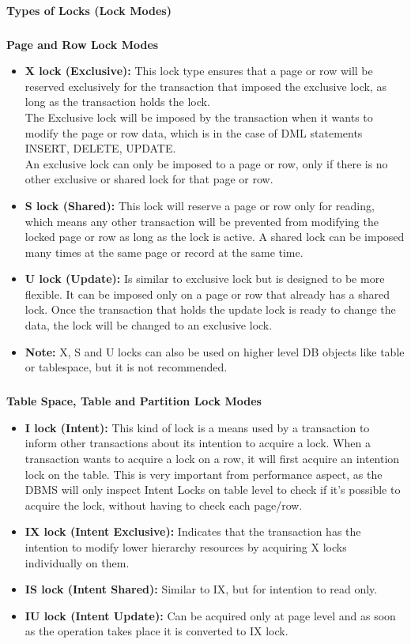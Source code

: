 \paragraph{} \textbf{Types of Locks (Lock Modes)}
\subparagraph{} \textbf{Page and Row Lock Modes}
\begin{itemize}
	\item \textbf{X lock (Exclusive):} This lock type ensures that a page or row will be reserved exclusively for the transaction that imposed the exclusive lock, as long as the transaction holds the lock.\\The Exclusive lock will be imposed by the transaction when it wants to modify the page or row data, which is in the case of DML statements INSERT, DELETE, UPDATE.\\An exclusive lock can only be imposed to a page or row, only if there is no other exclusive or shared lock for that page or row.
	\item \textbf{S lock (Shared):} This lock will reserve a page or row only for reading, which means any other transaction will be prevented from modifying the locked page or row as long as the lock is active. A shared lock can be imposed many times at the same page or record at the same time.
	\item \textbf{U lock (Update):} Is similar to exclusive lock but is designed to be more flexible. It can be imposed only on a page or row that already has a shared lock. Once the transaction that holds the update lock is ready to change the data, the lock will be changed to an exclusive lock.
	\item \textbf{Note:} X, S and U locks can also be used on higher level \acs{DB} objects like table or tablespace, but it is not recommended.
\end{itemize}
\subparagraph{} \textbf{Table Space, Table and Partition Lock Modes}
\begin{itemize}
	\item \textbf{I lock (Intent):} This kind of lock is a means used by a transaction to inform other transactions about its intention to acquire a lock. When a transaction wants to acquire a lock on a row, it will first acquire an intention lock on the table. This is very important from performance aspect, as the \acs{DBMS} will only inspect Intent Locks on table level to check if it's possible to acquire the lock, without having to check each page/row.
	\item \textbf{IX lock (Intent Exclusive):} Indicates that the transaction has the intention to modify lower hierarchy resources by acquiring X locks individually on them.
	\item \textbf{IS lock (Intent Shared):} Similar to IX, but for intention to read only.
	\item \textbf{IU lock (Intent Update):} Can be acquired only at page level and as soon as the operation takes place it is converted to IX lock.
\end{itemize}
